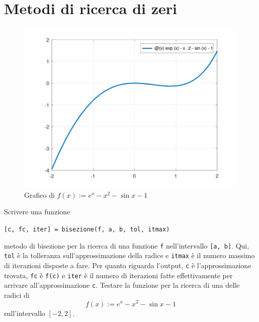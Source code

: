 
\section{Metodi di ricerca di zeri}

\begin{figure}
\centering
\includegraphics[width=.7\textwidth]{../zeri/graph1.png}
\caption{Grafico di \(f(x) := e^x - x^2 - \sin x - 1\)}
\end{figure}

\begin{esercizio}
Scrivere una funzione
\begin{center}
\lstinline£[c, fc, iter] = bisezione(f, a, b, tol, itmax)£
\end{center}
metodo di bisezione per la ricerca di una funzione \lstinline£f£ nell'intervallo \lstinline£[a, b]£. Qui, \lstinline£tol£ è la tolleranza sull'approssimazione della radice e \lstinline£itmax£ è il numero massimo di iterazioni disposte a fare. Per quanto riguarda l'output, \lstinline£c£ è l'approssimazione trovata, \lstinline£fc£ è \lstinline£f(c)£ e \lstinline£iter£ è il numero di iterazioni fatte effettivamente per arrivare all'approssimazione \lstinline£c£. Testare la funzione per la ricerca di una delle radici di
\[f(x) := e^x - x^2 - \sin x - 1\]
sull'intervallo \([-2, 2]\).
\end{esercizio}


